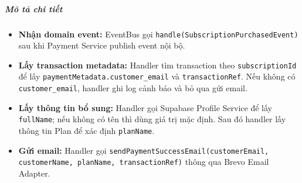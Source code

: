 \subparagraph{Mô tả chi tiết}
\begin{itemize}
\item \textbf{Nhận domain event:} EventBus gọi \texttt{handle(SubscriptionPurchasedEvent)} sau khi Payment Service publish event nội bộ.
\item \textbf{Lấy transaction metadata:} Handler tìm transaction theo \texttt{subscriptionId} để lấy \texttt{paymentMetadata.customer\_email} và \texttt{transactionRef}. Nếu không có \texttt{customer\_email}, handler ghi log cảnh báo và bỏ qua gửi email.
\item \textbf{Lấy thông tin bổ sung:} Handler gọi Supabase Profile Service để lấy \texttt{fullName}; nếu không có tên thì dùng giá trị mặc định. Sau đó handler lấy thông tin Plan để xác định \texttt{planName}.
\item \textbf{Gửi email:} Handler gọi \texttt{sendPaymentSuccessEmail(customerEmail, customerName, planName, transactionRef)} thông qua Brevo Email Adapter.
\end{itemize}
